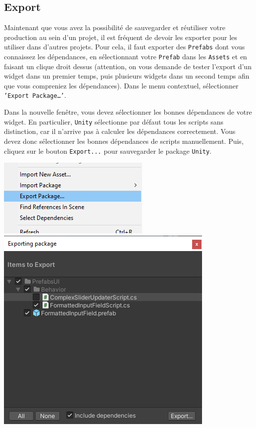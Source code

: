 \documentclass[a4paper,10pt]{article}
\begin{document}
\subsection{Export}

Maintenant que vous avez la possibilité de sauvegarder et réutiliser votre production au sein d'un projet, il est fréquent de devoir les exporter pour les utiliser dans d'autres projets. 
Pour cela, il faut exporter des \texttt{Prefabs} dont vous connaissez les dépendances, en sélectionnant votre \texttt{Prefab} dans les \texttt{Assets} et en faisant un clique droit dessus (attention, on vous demande de tester l'export d'un widget dans un premier temps, puis plusieurs widgets dans un second temps afin que vous compreniez les dépendances). Dans le menu contextuel, sélectionner \texttt{'Export Package\ldots'}.

Dans la nouvelle fenêtre, vous devez sélectionner les bonnes dépendances de votre widget. En particulier, \texttt{Unity} sélectionne par défaut tous les scripts sans distinction, car il n'arrive pas à calculer les dépendances correctement. Vous devez donc sélectionner les bonnes dépendances de scripts manuellement. Puis, cliquez sur le bouton \texttt{Export...} pour sauvegarder le package \texttt{Unity}.

\begin{center}
\hfill \includegraphics[width=0.35\linewidth]{fig/unity_set_ui_export_package}
\hfill \includegraphics[width=0.5\linewidth]{fig/unity_set_ui_export_prefab_deps}
\hfill 
\end{center}
\end{document}
